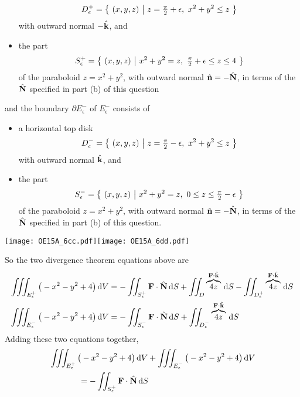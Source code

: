 \begin{solution}
\begin{itemize}
\begin{equation*}
   D_{\epsilon}^+ =\big\{ \ (x,y,z)\ \big|\ z=\tfrac{\pi}{2}+\epsilon,\ x^2+y^2\le z\ \big\}
\end{equation*}
 with outward normal $-\hat{\mathbf{k}}$, and
\item the part 
\begin{equation*}
   S_{\epsilon}^+ =\big\{ \ (x,y,z)\ \big|\ x^2+y^2 = z,\ \tfrac{\pi}{2}+\epsilon\le z\le 4\ \big\}
\end{equation*}
of the paraboloid $z=x^2+y^2$, with outward normal $\hat{\mathbf{n}} = -\hat{\mathbf{N}}$,
          in terms of the $\hat{\mathbf{N}}$ specified in part (b) of this question
\end{itemize}
and the boundary $\partial E_\epsilon^-$ of $E_\epsilon^-$ consists of
\begin{itemize}\itemsep1pt \parskip0pt  %
\item a horizontal top disk
\begin{equation*}
   D_{\epsilon}^- =\big\{ \ (x,y,z)\ \big|\ z=\tfrac{\pi}{2}-\epsilon,\ x^2+y^2\le z\ \big\}
\end{equation*} 
with outward normal $\hat{\mathbf{k}}$, and
\item the part 
\begin{equation*}
   S_{\epsilon}^- =\big\{ \ (x,y,z)\ \big|\ x^2+y^2 = z,\ 0\le z\le \tfrac{\pi}{2}-\epsilon\ \big\}
\end{equation*}
of the paraboloid $z=x^2+y^2$, with outward normal $\hat{\mathbf{n}}=-\hat{\mathbf{N}}$,
          in terms of the $\hat{\mathbf{N}}$ specified in part (b) of this question.
\end{itemize}
 \begin{center}
    \texttt{[image: OE15A\_6cc.pdf]}\quad \texttt{[image: OE15A\_6dd.pdf]}
\end{center}
So the two divergence theorem equations above are
\begin{align*}
 \iiint_{E_\epsilon^+} \big(-x^2-y^2+4\big)\,\mathrm{d}V 
 &= -\iint_{S_\epsilon^+}\mathbf{F}\cdot\hat{\mathbf{N}}\,\mathrm{d}S
    + \iint_{D}\overbrace{4z}^{\mathbf{F}\cdot\hat{\mathbf{k}}}\,\mathrm{d}S
    - \iint_{D_\epsilon^+}\overbrace{4z}^{\mathbf{F}\cdot\hat{\mathbf{k}}}\,\mathrm{d}S\\
 \iiint_{E_\epsilon^-} \big(-x^2-y^2+4\big)\,\mathrm{d}V
 &= -\iint_{S_\epsilon^-}\mathbf{F}\cdot\hat{\mathbf{N}}\,\mathrm{d}S
          + \iint_{D_\epsilon^-}\overbrace{4z}^{\mathbf{F}\cdot\hat{\mathbf{k}}}\,\mathrm{d}S
\end{align*}
Adding these two equations together,
\begin{align*}
&\tripInt_{E_\epsilon^+} \big(-x^2-y^2+4\big)\,\dee{V} 
   +  \tripInt_{E_\epsilon^-} \big(-x^2-y^2+4\big)\,\dee{V}\\
&\hskip0.5in= -\dblInt_{S_\epsilon^+}\vF\cdot\hN\,\dee{S}

\end{align*}
\end{solution}

